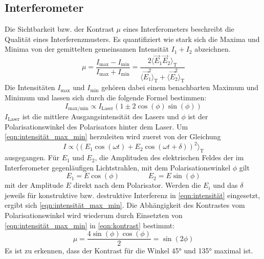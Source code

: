     \subsection{Interferometer}
        Die Sichtbarkeit bzw. der Kontrast $\mu$ eines Interferometers \cite{hecht_optik_2018} beschreibt die Qualität eines Interferenzmusters.
        Es quantifiziert wie stark sich die Maxima und Minima von der gemittelten gemeinsamen Intensität $I_1 + I_2$ abzeichnen.
        \begin{equation}
            \mu = \frac{I_{\text{max}} - I_{\text{min}}}{I_{\text{max}} + I_{\text{min}}} = \frac{2\langle\vec{E}_1\vec{E}_2\rangle_{\text{T}}}{\langle\vec{E}^2_1\rangle_{\text{T}} + \langle\vec{E}^2_2\rangle_{\text{T}}}
            \label{eqn:kontrast}
        \end{equation}
        Die Intensitäten $I_{\text{max}}$ und $I_{\text{min}}$ gehören dabei einem benachbarten Maximum und Minimum und lassen sich durch die folgende Formel bestimmen:
        \begin{equation}
            I_{\text{max/min}} \propto I_{\text{Laser}} \left(1 \pm 2 \cos(\phi)\sin(\phi)\right)
            \label{eqn:intensität_max_min}
        \end{equation}
        $I_{\text{Laser}}$ ist die mittlere Ausgangsintensität des Lasers und $\phi$ ist der Polarisationswinkel des Polarisators hinter dem Laser.
        Um \eqref{eqn:intensität_max_min} herzuleiten wird zuerst von der Gleichung
        \begin{equation}
            I \propto \langle\left(E_1 \cos(\omega t) + E_2 \cos(\omega t + \delta)\right)^2\rangle_{\text{T}}
            \label{eqn:intensität}
        \end{equation}
        ausgegangen. Für $E_1$ und $E_2$, die Amplituden des elektrischen Feldes der im Interferometer gegenläufigen Lichtstrahlen, mit dem Polarisationswinkel $\phi$ gilt
        \begin{equation*}
            E_1 = E \cos(\phi) \qquad \qquad E_2 = E \sin(\phi)
        \end{equation*}
        mit der Amplitude $E$ direkt nach dem Polarisator.
        Werden die $E_i$ und das $\delta$ jeweils für konstruktive bzw. destruktive Interferenz in \eqref{eqn:intensität} eingesetzt, ergibt sich \eqref{eqn:intensität_max_min}.
        Die Abhängigkeit des Kontrastes vom Polarisationswinkel wird wiederum durch Einsetzten von \eqref{eqn:intensität_max_min} in \eqref{eqn:kontrast} bestimmt:
        \begin{equation*}
            \mu = \frac{4\sin(\phi)\cos(\phi)}{2} = \sin(2\phi)
        \end{equation*}
        Es ist zu erkennen, dass der Kontrast für die Winkel 45° und 135° maximal ist.

